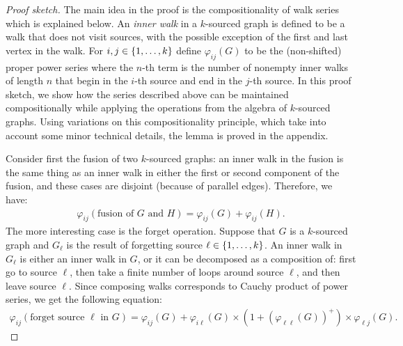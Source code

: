 \begin{proof}[Proof sketch] The main idea in the proof is the compositionality of walk series which is explained below. 
    An \emph{inner walk} in a $k$-sourced graph is defined to be a walk that does not visit sources, with the possible exception of the first and last vertex in the walk.  For $i,j \in \{1,\ldots,k\}$ define  $\varphi_{ij}(G)$ to be the (non-shifted) proper power series where the $n$-th term is the number of nonempty inner walks of length $n$ that begin in the $i$-th source and end in the $j$-th source. In this proof sketch, we show how the series described above can be maintained compositionally
      while applying the operations from the algebra of $k$-sourced graphs. Using variations on this compositionality principle, which take into account some minor technical details, the lemma is proved in the appendix. 
    
      Consider first the fusion of two $k$-sourced graphs: an inner walk in the fusion is the same thing as an inner walk in either the first or second component of the fusion, and these cases are disjoint (because of parallel edges). Therefore, we have:
    \begin{align*}
    \varphi_{ij}(\text{fusion of $G$ and $H$}) =  \varphi_{ij}(G) + \varphi_{ij}(H).
    \end{align*}
    The more interesting case is the forget operation. Suppose that $G$ is a $k$-sourced graph and $G_\ell$ is the result of forgetting source $\ell \in \{1,\ldots,k\}$. An inner walk in $G_\ell$ is either an inner walk in $G$, or it can be decomposed as a composition of: first go to source $\ell$, then take a finite number of loops around source $\ell$, and then leave source $\ell$. Since composing walks corresponds to Cauchy product of power series, we get the  following equation:
    \begin{align*}
    \varphi_{ij}(\text{forget source $\ell$ in $G$}) = \varphi_{ij}(G) + \varphi_{i\ell}(G) \times (1 + (\varphi_{\ell \ell}(G))^+) \times \varphi_{\ell j}(G).
    \end{align*}
    \end{proof}

